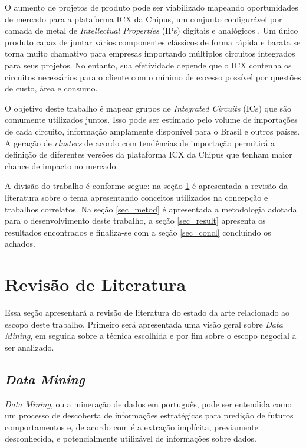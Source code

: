 \documentclass[conference,compsoc]{IEEEtran}
\begin{document}
O aumento de projetos de produto pode ser viabilizado mapeando oportunidades de mercado para a plataforma ICX da Chipus, um conjunto configurável por camada de metal de \textit{Intellectual Properties} (IPs) digitais e analógicos \cite{datasheet_icx}. Um único produto capaz de juntar vários componentes clássicos de forma rápida e barata se torna muito chamativo para empresas importando múltiplos circuitos integrados para seus projetos. No entanto, sua efetividade depende que o ICX contenha os circuitos necessários para o cliente com o mínimo de excesso possível por questões de custo, área e consumo.

O objetivo deste trabalho é mapear grupos de \textit{Integrated Circuits} (ICs) que são comumente utilizados juntos. Isso pode ser estimado pelo volume de importações de cada circuito, informação amplamente disponível para o Brasil e outros países. A geração de \textit{clusters} de acordo com tendências de importação permitirá a definição de diferentes versões da plataforma ICX da Chipus que tenham maior chance de impacto no mercado.

A divisão do trabalho é conforme segue: na seção \ref{sec_rev} é apresentada a revisão da literatura sobre o tema apresentando conceitos utilizados na concepção e trabalhos correlatos. Na seção \ref{sec_metod} é apresentada a metodologia adotada para o desenvolvimento deste trabalho, a seção \ref{sec_result} apresenta os resultados encontrados e finaliza-se com a seção \ref{sec_concl} concluindo os achados.

\section{Revisão de Literatura}\label{sec_rev}
Essa seção apresentará a revisão de literatura do estado da arte relacionado ao escopo deste trabalho. Primeiro será apresentada uma visão geral sobre \textit{Data Mining}, em seguida sobre a técnica escolhida e por fim sobre o escopo negocial a ser analizado.

\subsection{\textit{Data Mining}}
\textit{Data Mining}, ou a mineração de dados em português, pode ser entendida como um processo de descoberta de informações estratégicas para predição de futuros comportamentos e, de acordo com \citet{witten_data_2005} é a extração implícita, previamente desconhecida, e potencialmente utilizável de informações sobre dados. 
\end{document}
